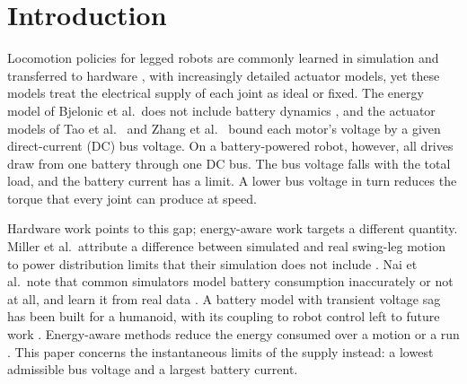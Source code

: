 \section{Introduction}\label{sec:intro}
Locomotion policies for legged robots are commonly learned in simulation and transferred to hardware \cite{hwangbo2019agile}, with increasingly detailed actuator models, yet these models treat the electrical supply of each joint as ideal or fixed. The energy model of Bjelonic et al.\ does not include battery dynamics \cite{bjelonic2026pace}, and the actuator models of Tao et al.\ \cite{tao2026actuator} and Zhang et al.\ \cite{zhang2026vra} bound each motor's voltage by a given direct-current (DC) bus voltage. On a battery-powered robot, however, all drives draw from one battery through one DC bus. The bus voltage falls with the total load, and the battery current has a limit. A lower bus voltage in turn reduces the torque that every joint can produce at speed.

Hardware work points to this gap; energy-aware work targets a different quantity. Miller et al.\ attribute a difference between simulated and real swing-leg motion to power distribution limits that their simulation does not include \cite{miller2025spot}. Nai et al.\ note that common simulators model battery consumption inaccurately or not at all, and learn it from real data \cite{nai2025power}. A battery model with transient voltage sag has been built for a humanoid, with its coupling to robot control left to future work \cite{evagora2025battery}. Energy-aware methods reduce the energy consumed over a motion or a run \cite{valsecchi2024power,huang2026eco,lee2026raibo2}. This paper concerns the instantaneous limits of the supply instead: a lowest admissible bus voltage and a largest battery current.


